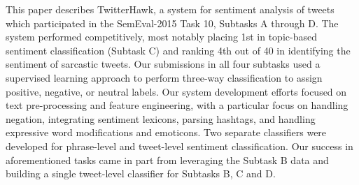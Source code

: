 This paper describes TwitterHawk, a system for sentiment analysis of tweets which participated in the SemEval-2015 Task 10, Subtasks A through D. The system performed competitively, most notably placing 1st in topic-based sentiment classification (Subtask C) and ranking 4th out of 40 in identifying the sentiment of sarcastic tweets. Our submissions in all four subtasks used a supervised learning approach to perform three-way classification to assign positive, negative, or neutral labels. Our system development efforts focused on text pre-processing and feature engineering, with a particular focus on handling negation, integrating sentiment lexicons, parsing hashtags, and handling expressive word modifications and emoticons. Two separate classifiers were developed for phrase-level and tweet-level sentiment classification. Our success in aforementioned tasks came in part from leveraging the Subtask B data and building a single tweet-level classifier for Subtasks B, C and D.
